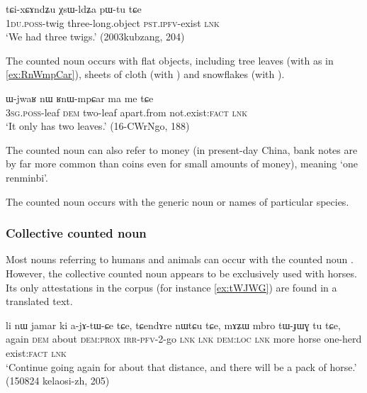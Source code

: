\begin{exe}
\ex \label{ex:ndZu.XsWldZa}
\gll  tɕi-xɕɤndʑu χsɯ-ldʑa pɯ-tu tɕe \\
\textsc{1du}.\textsc{poss}-twig three-long.object  \textsc{pst}.\textsc{ipfv}-exist \textsc{lnk} \\
\glt `We had three twigs.'  (2003kubzang, 204)
\end{exe}

The counted noun  occurs with flat objects, including tree leaves (with  as in \ref{ex:RnWmpCar}), sheets of cloth (with ) and snowflakes (with ).  

\begin{exe}
\ex \label{ex:RnWmpCar}
\gll ɯ-jwaʁ nɯ ʁnɯ-mpɕar ma me tɕe \\
\textsc{3sg}.\textsc{poss}-leaf \textsc{dem} two-leaf apart.from not.exist:\textsc{fact} \textsc{lnk} \\
\glt `It only has two leaves.'  (16-CWrNgo, 188)
\end{exe}

The counted noun  can also refer to money (in present-day China, bank notes are by far more common than coins even for small amounts of money), meaning `one renminbi'.

The counted noun  occurs with the generic noun  or names of particular species.

\subsubsection{Collective counted noun} \label{sec:collective.counted.noun}
Most nouns referring to humans and animals can occur with the counted noun . However, the collective counted noun  appears to be exclusively used with horses. Its only attestations in the corpus (for instance \ref{ex:tWJWG}) are found in a translated text.

\begin{exe}
\ex \label{ex:tWJWG}
\gll li nɯ jamar ki a-jɤ-tɯ-ɕe tɕe, tɕendɤre nɯtɕu tɕe, mɤʑɯ mbro tɯ-ɟɯɣ tu tɕe,  \\
again \textsc{dem} about \textsc{dem}:\textsc{prox} \textsc{irr}-\textsc{pfv}-2-go \textsc{lnk} \textsc{lnk} \textsc{dem}:\textsc{loc} \textsc{lnk} more horse one-herd exist:\textsc{fact} \textsc{lnk} \\
\glt `Continue going again for about that distance, and there will be a pack of horse.' (150824 kelaosi-zh, 205)
\end{exe}

